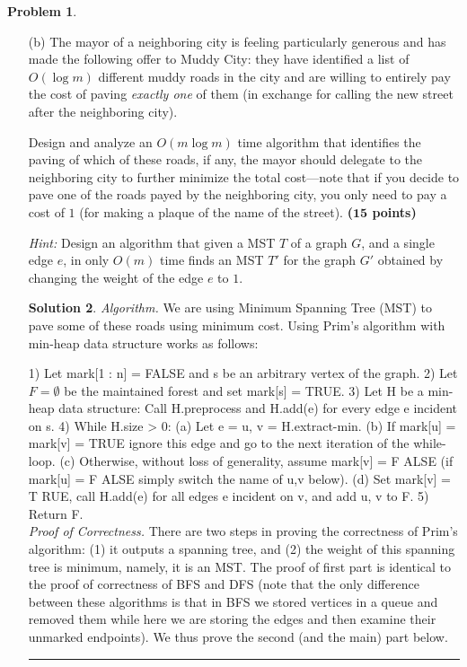 \documentclass{article}
\theoremstyle{definition}
\newtheorem{problem}{Problem}
\def\fline{\rule{0.75\linewidth}{0.5pt}}
\newcommand{\finishline}{\begin{center}\fline\end{center}}
\newtheorem*{solution*}{Solution}
\newenvironment{solution}{\begin{solution*}}{{\finishline} \end{solution*}}
\newcommand{\grade}[1]{\hfill{\textbf{($\mathbf{#1}$ points)}}}
\begin{document}
\begin{problem}
\begin{enumerate}
\begin{solution}
\end{solution}

		\item [(b)] The mayor of a neighboring city is feeling particularly generous and has made the following offer to Muddy City: they have identified a list of $O(\log{m})$ different muddy roads in the city and are willing to entirely pay
		 the cost of paving \emph{exactly one} of them (in exchange for calling the new street after the neighboring city). 
		 
		 Design and analyze an $O(m\log{m})$ time algorithm that identifies the paving of which of these roads, if any, the mayor should delegate to the neighboring city 
		 to further minimize the total cost---note that if you  decide to pave one of the roads payed by the neighboring city, you only need to pay a cost of $1$ (for making a plaque of the name of the street). \grade{15}
		 
		 \smallskip
		 \emph{Hint:} Design an algorithm that given a MST $T$ of a graph $G$, and a single edge $e$, in only $O(m)$ time finds an MST $T'$ for the graph $G'$ obtained by changing the weight of the edge $e$ to $1$. 
		 
		 \medskip

\begin{solution}

\emph{Algorithm.} We are using Minimum Spanning Tree (MST) to pave some of these roads using minimum cost. Using Prim's algorithm with min-heap data structure works as follows: 
	


1) Let mark[1 : n] = FALSE and s be an arbitrary vertex of the graph. 2) Let $F = \emptyset$ be the maintained forest and set mark[s] = TRUE. 3) Let H be a min-heap data structure: Call H.preprocess and H.add(e) for every edge e incident on s. 4) While H.size > 0: (a) Let e = {u, v} = H.extract-min. (b) If mark[u] = mark[v] = TRUE ignore this edge and go to the next iteration of the while-loop. (c) Otherwise, without loss of generality, assume mark[v] = F ALSE (if mark[u] = F ALSE simply switch the name of u,v below). (d) Set mark[v] = T RUE, call H.add(e) for all edges e incident on v, and add {u, v} to F. 5) Return F. \\


	\emph{Proof of Correctness.} There are two steps in proving the correctness of Prim’s algorithm: (1) it outputs a spanning tree, and (2) the weight of this spanning tree is minimum, namely, it is an MST. The proof of
first part is identical to the proof of correctness of BFS and DFS (note that the only difference between these algorithms is that in BFS we stored vertices in a queue and removed them while here we are storing the edges and then examine their unmarked endpoints). We thus prove the second (and the main) part below.


\end{solution}
\end{enumerate}
\end{problem}
\end{document}
